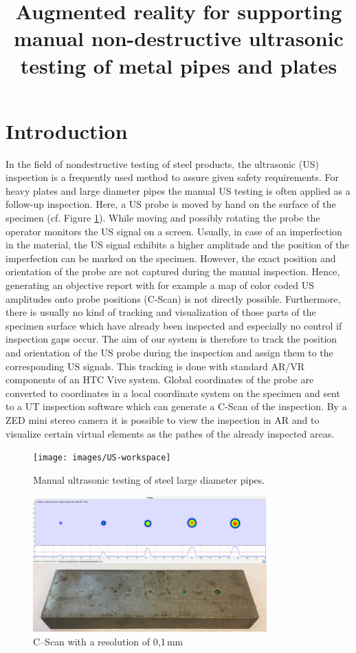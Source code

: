 \documentclass{VRARWorkshop}
\title{Augmented reality for supporting manual non-destructive ultrasonic testing of metal pipes and plates}
\begin{document}
\section{Introduction}

In the field of nondestructive testing of steel products, the ultrasonic (US) inspection is a frequently used method to assure given safety requirements. For heavy plates and large diameter pipes the manual US testing is often applied as a follow-up inspection. Here, a US probe is moved by hand on the surface of the specimen (cf. Figure \ref{fig:manual_UT}). While moving and possibly rotating the probe the operator monitors the US signal on a screen. Usually, in case of an imperfection in the material, the US signal exhibits a higher amplitude and the position of the imperfection can be marked on the specimen.
However, the exact position and orientation of the probe are not captured during the manual inspection. Hence, generating an objective report with for example a map of color coded US amplitudes onto probe positions (C-Scan) is not directly possible. Furthermore, there is usually no kind of tracking and visualization of those parts of the specimen surface which have already been inspected and especially no control if inspection gaps occur.
The aim of our system is therefore to track the position and orientation of the US probe during the inspection and assign them to the corresponding US signals. This tracking is done with standard AR/VR components of an HTC Vive system. Global coordinates of the probe are converted to coordinates in a local coordinate system on the specimen and sent to a UT inspection software which can generate a C-Scan of the inspection. By a ZED mini stereo camera it is possible to view the inspection in AR and to visualize certain virtual elements as the pathes of the already inspected areas.

\begin{figure}[h!]
    \begin{center}
        \texttt{[image: images/US-workspace]}
        \caption{\label{fig:manual_UT} Manual ultrasonic testing of steel large diameter pipes.}
    \end{center}
\end{figure}

\begin{figure}[h!]
    \begin{center}
        \includegraphics[width=90mm]{images/CScan}
        \caption{\label{fig:cScan} C--Scan with a resolution of 0,1\,mm}
    \end{center}
\end{figure}
\end{document}
